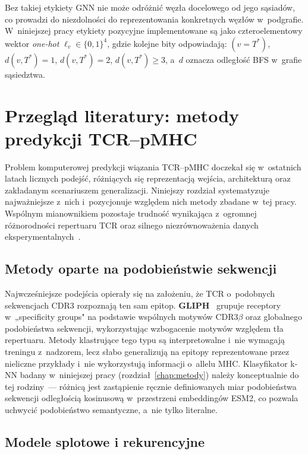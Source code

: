\documentclass{SGGW-thesis}
\begin{document}
Bez takiej etykiety GNN nie może odróżnić węzła docelowego od jego sąsiadów, co prowadzi do
niezdolności do reprezentowania konkretnych węzłów w~podgrafie. W~niniejszej pracy etykiety pozycyjne
implementowane są jako czteroelementowy wektor \textit{one-hot} $\boldsymbol{\ell}_v \in \{0,1\}^4$,
gdzie kolejne bity odpowiadają: $(v = T^*)$, $d(v, T^*) = 1$, $d(v, T^*) = 2$, $d(v, T^*) \geq 3$,
a~$d$ oznacza odległość BFS w~grafie sąsiedztwa.


\chapter{Przegląd literatury: metody predykcji TCR--pMHC}
\label{chap:przeglad}

Problem komputerowej predykcji wiązania TCR--pMHC doczekał się w~ostatnich latach licznych podejść,
różniących się reprezentacją wejścia, architekturą oraz zakładanym scenariuszem generalizacji.
Niniejszy rozdział systematyzuje najważniejsze z~nich i~pozycjonuje względem nich metody zbadane
w~tej pracy. Wspólnym mianownikiem pozostaje trudność wynikająca z~ogromnej różnorodności repertuaru
TCR oraz silnego niezrównoważenia danych eksperymentalnych~\cite{moris2021}.

\section{Metody oparte na podobieństwie sekwencji}

Najwcześniejsze podejścia opierały się na założeniu, że TCR o~podobnych sekwencjach CDR3 rozpoznają
ten sam epitop. \textbf{GLIPH}~\cite{glanville2017} grupuje receptory w~„specificity groups" na
podstawie wspólnych motywów CDR3$\beta$ oraz globalnego podobieństwa sekwencji, wykorzystując
wzbogacenie motywów względem tła repertuaru. Metody klastrujące tego typu są interpretowalne
i~nie wymagają treningu z~nadzorem, lecz słabo generalizują na epitopy reprezentowane przez
nieliczne przykłady i~nie wykorzystują informacji o~allelu MHC. Klasyfikator k-NN badany w~niniejszej
pracy (rozdział~\ref{chap:metody}) należy konceptualnie do tej rodziny~--- różnicą jest zastąpienie
ręcznie definiowanych miar podobieństwa sekwencji odległością kosinusową w~przestrzeni embeddingów
ESM2, co pozwala uchwycić podobieństwo semantyczne, a~nie tylko literalne.

\section{Modele splotowe i rekurencyjne}
\end{document}
